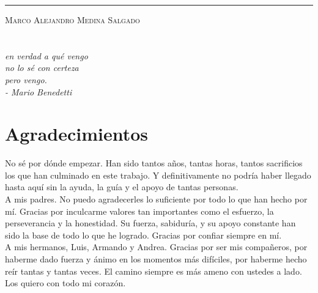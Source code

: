\documentclass[10pt, oneside]{book}
\begin{document}
\rule[1em]{20em}{0.5pt} %

\textsc{Marco Alejandro Medina Salgado}

\endgroup
\vspace*{\fill}


\pagestyle{plain}
\frontmatter

\chapter*{}
\begin{flushright}
\textit{en verdad a qué vengo \\ no lo sé con certeza \\ pero vengo. \\ - Mario Benedetti}
\end{flushright}


\chapter*{Agradecimientos}

No sé por dónde empezar. Han sido tantos años, tantas horas, tantos sacrificios los que han culminado en este trabajo. Y definitivamente no podría haber llegado hasta aquí sin la ayuda, la guía y el apoyo de tantas personas. \\

\noindent A mis padres. No puedo agradecerles lo suficiente por todo lo que han hecho por mí. Gracias por inculcarme valores tan importantes como el esfuerzo, la perseverancia y la honestidad. Su fuerza, sabiduría, y su apoyo constante han sido la base de todo lo que he logrado. Gracias por confiar siempre en mí. \\

\noindent A mis hermanos, Luis, Armando y Andrea. Gracias por ser mis compañeros, por haberme dado fuerza y ánimo en los momentos más difíciles, por haberme hecho reír tantas y tantas veces. El camino siempre es más ameno con ustedes a lado. Los quiero con todo mi corazón. \\
\end{document}
